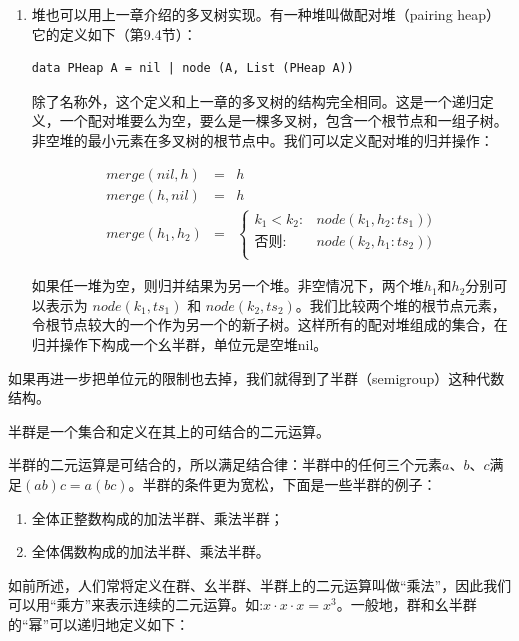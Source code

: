 \documentclass[b5paper]{ctexart}
\begin{document}
\begin{enumerate}
\item 堆也可以用上一章介绍的多叉树实现。有一种堆叫做配对堆（pairing heap）它的定义如下（\cite{LiuXinyu2017}第9.4节）：

\begin{lstlisting}
data PHeap A = nil | node (A, List (PHeap A))
\end{lstlisting}

除了名称外，这个定义和上一章的多叉树的结构完全相同。这是一个递归定义，一个配对堆要么为空，要么是一棵多叉树，包含一个根节点和一组子树。非空堆的最小元素在多叉树的根节点中。我们可以定义配对堆的归并操作：

\[
\begin{array}{rcl}
merge(nil, h) & = & h \\
merge(h, nil) & = & h \\
merge(h_1, h_2) & = &
  \begin{cases}
  k_1 < k_2 : & node(k_1, h_2 : ts_1)) \\
  \text{否则} : & node(k_2, h_1 : ts_2)) \\
  \end{cases}
\end{array}
\]

如果任一堆为空，则归并结果为另一个堆。非空情况下，两个堆$h_1$和$h_2$分别可以表示为 $node(k_1, ts_1)$ 和 $node(k_2, ts_2)$。我们比较两个堆的根节点元素，令根节点较大的一个作为另一个的新子树。这样所有的配对堆组成的集合，在归并操作下构成一个幺半群，单位元是空堆nil。

\end{enumerate}

如果再进一步把单位元的限制也去掉，我们就得到了半群（semigroup）这种代数结构。

\begin{definition}
半群是一个集合和定义在其上的可结合的二元运算。
\end{definition}

半群的二元运算是可结合的，所以满足结合律：半群中的任何三个元素$a$、$b$、$c$满足$(ab)c = a(bc)$。半群的条件更为宽松，下面是一些半群的例子：

\begin{enumerate}
\item 全体正整数构成的加法半群、乘法半群；
\item 全体偶数构成的加法半群、乘法半群。
\end{enumerate}

如前所述，人们常将定义在群、幺半群、半群上的二元运算叫做“乘法”，因此我们可以用“乘方”来表示连续的二元运算。如:$x \cdot x \cdot x = x^3$。一般地，群和幺半群的“幂”可以递归地定义如下：
\end{document}
